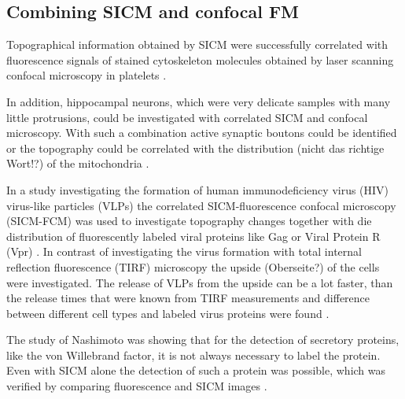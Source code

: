 \subsection{Combining SICM and confocal FM}

Topographical information obtained by SICM were successfully correlated with fluorescence signals
of stained cytoskeleton molecules obtained by laser scanning confocal microscopy in platelets 
\cite{Seifert2017}. 

In addition, hippocampal neurons, which were very delicate samples with many little protrusions, 
could be investigated with correlated SICM and confocal microscopy. With such a combination active
synaptic boutons could be identified \cite{Novak2013} or the topography could be correlated with 
the distribution (nicht das richtige Wort!?) of the mitochondria \cite{Takahashi2019}.

In a study investigating the formation of human immunodeficiency virus (HIV) virus-like particles 
(VLPs) the correlated SICM-fluorescence confocal microscopy (SICM-FCM) was used to investigate 
topography changes together with die distribution of fluorescently labeled viral proteins like Gag 
or Viral Protein R (Vpr) \cite{Bednarska2020}. In contrast of investigating the virus formation 
with total internal reflection fluorescence (TIRF) microscopy \cite{Jouvenet2008} the upside 
(Oberseite?) of the cells were investigated. The release of VLPs from the upside can be a lot 
faster, than the release times that were known from TIRF measurements and difference between 
different cell types and labeled virus proteins were found \cite{Bednarska2020}. 

The study of Nashimoto was showing that for the detection of secretory proteins, like the von 
Willebrand factor, it is not always necessary to label the protein. Even with SICM alone the 
detection of such a protein was possible, which was verified by comparing fluorescence and SICM 
images \cite{Nashimoto2015}.



